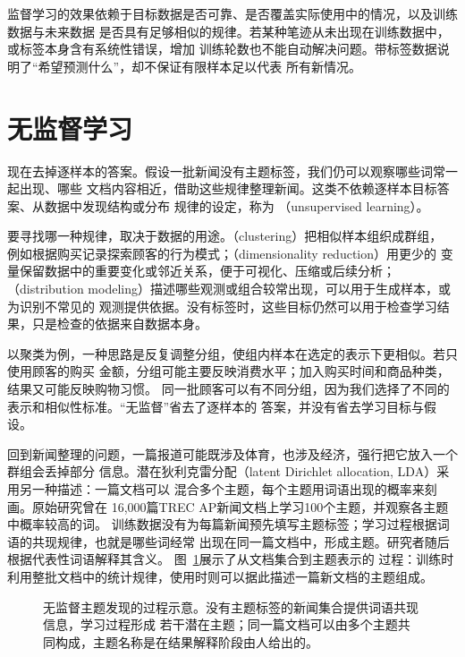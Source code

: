 监督学习的效果依赖于目标数据是否可靠、是否覆盖实际使用中的情况，以及训练数据与未来数据
是否具有足够相似的规律。若某种笔迹从未出现在训练数据中，或标签本身含有系统性错误，增加
训练轮数也不能自动解决问题。带标签数据说明了“希望预测什么”，却不保证有限样本足以代表
所有新情况。

\section{无监督学习}
\label{sec:unsupervised-learning}

现在去掉逐样本的答案。假设一批新闻没有主题标签，我们仍可以观察哪些词常一起出现、哪些
文档内容相近，借助这些规律整理新闻。这类不依赖逐样本目标答案、从数据中发现结构或分布
规律的设定，称为
（unsupervised learning）。

要寻找哪一种规律，取决于数据的用途。（clustering）把相似样本组织成群组，
例如根据购买记录探索顾客的行为模式；（dimensionality reduction）用更少的
变量保留数据中的重要变化或邻近关系，便于可视化、压缩或后续分析；
（distribution modeling）描述哪些观测或组合较常出现，可以用于生成样本，或为识别不常见的
观测提供依据。没有标签时，这些目标仍然可以用于检查学习结果，只是检查的依据来自数据本身。

以聚类为例，一种思路是反复调整分组，使组内样本在选定的表示下更相似。若只使用顾客的购买
金额，分组可能主要反映消费水平；加入购买时间和商品种类，结果又可能反映购物习惯。
同一批顾客可以有不同分组，因为我们选择了不同的表示和相似性标准。“无监督”省去了逐样本的
答案，并没有省去学习目标与假设。

回到新闻整理的问题，一篇报道可能既涉及体育，也涉及经济，强行把它放入一个群组会丢掉部分
信息。潜在狄利克雷分配（latent Dirichlet allocation, LDA）采用另一种描述：一篇文档可以
混合多个主题，每个主题用词语出现的概率来刻画。原始研究曾在
16,000篇TREC AP新闻文档上学习100个主题，并观察各主题中概率较高的词。
训练数据没有为每篇新闻预先填写主题标签；学习过程根据词语的共现规律，也就是哪些词经常
出现在同一篇文档中，形成主题。研究者随后根据代表性词语解释其含义。
图~\ref{fig:unsupervised-topic-process}展示了从文档集合到主题表示的
过程：训练时利用整批文档中的统计规律，使用时则可以据此描述一篇新文档的主题组成。

\begin{figure}[!htb]
  \centering
  \caption{无监督主题发现的过程示意。没有主题标签的新闻集合提供词语共现信息，学习过程形成
  若干潜在主题；同一篇文档可以由多个主题共同构成，主题名称是在结果解释阶段由人给出的。}
  \label{fig:unsupervised-topic-process}
\end{figure}
\FloatBarrier


